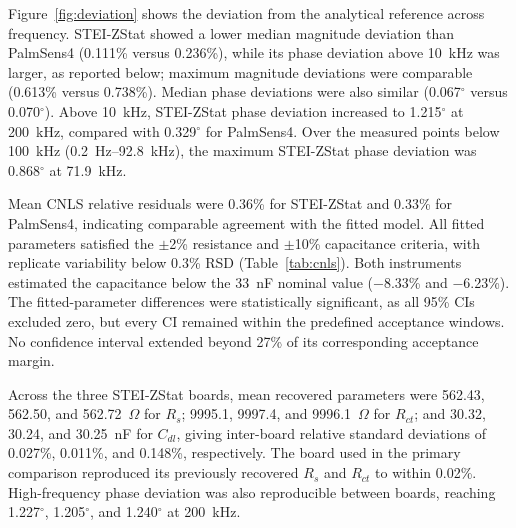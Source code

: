 Figure~\ref{fig:deviation} shows the deviation from the analytical reference across frequency. STEI-ZStat showed a lower median magnitude deviation than PalmSens4 (0.111\% versus 0.236\%), while its phase deviation above 10~kHz was larger, as reported below; maximum magnitude deviations were comparable (0.613\% versus 0.738\%). Median phase deviations were also similar (0.067$^\circ$ versus 0.070$^\circ$). Above 10~kHz, STEI-ZStat phase deviation increased to 1.215$^\circ$ at 200~kHz, compared with 0.329$^\circ$ for PalmSens4. Over the measured points below 100~kHz (0.2~Hz--92.8~kHz), the maximum STEI-ZStat phase deviation was 0.868$^\circ$ at 71.9~kHz.

Mean CNLS relative residuals were 0.36\% for STEI-ZStat and 0.33\% for PalmSens4, indicating comparable agreement with the fitted model. All fitted parameters satisfied the $\pm$2\% resistance and $\pm$10\% capacitance criteria, with replicate variability below 0.3\% RSD (Table~\ref{tab:cnls}). Both instruments estimated the capacitance below the 33~nF nominal value ($-$8.33\% and $-$6.23\%). The fitted-parameter differences were statistically significant, as all 95\% CIs excluded zero, but every CI remained within the predefined acceptance windows. No confidence interval extended beyond 27\% of its corresponding acceptance margin.

Across the three STEI-ZStat boards, mean recovered parameters were 562.43, 562.50, and 562.72~$\Omega$ for $R_s$; 9995.1, 9997.4, and 9996.1~$\Omega$ for $R_{ct}$; and 30.32, 30.24, and 30.25~nF for $C_{dl}$, giving inter-board relative standard deviations of 0.027\%, 0.011\%, and 0.148\%, respectively. The board used in the primary comparison reproduced its previously recovered $R_s$ and $R_{ct}$ to within 0.02\%. High-frequency phase deviation was also reproducible between boards, reaching 1.227$^\circ$, 1.205$^\circ$, and 1.240$^\circ$ at 200~kHz.

